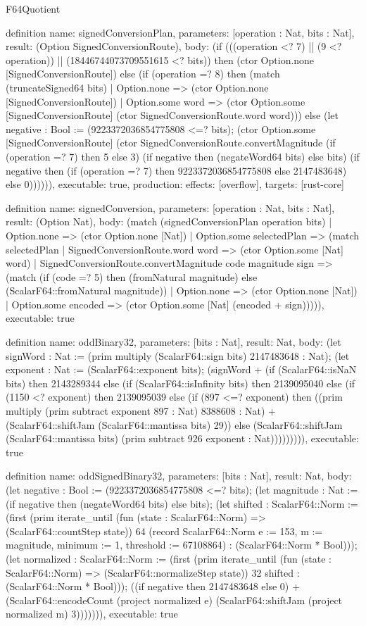 \begin{lexlean}{F64Quotient}
\begin{semanticmodule}
definition{
  name: signedConversionPlan,
  parameters: [operation : Nat, bits : Nat],
  result: (Option SignedConversionRoute),
  body: (if (((operation <? 7) || (9 <? operation)) || (18446744073709551615 <? bits)) then (ctor Option.none [SignedConversionRoute]) else (if (operation =? 8) then (match (truncateSigned64 bits)
    | Option.none => (ctor Option.none [SignedConversionRoute])
    | Option.some word => (ctor Option.some [SignedConversionRoute] (ctor SignedConversionRoute.word word))) else (let negative : Bool := (9223372036854775808 <=? bits); (ctor Option.some [SignedConversionRoute] (ctor SignedConversionRoute.convertMagnitude (if (operation =? 7) then 5 else 3) (if negative then (negateWord64 bits) else bits) (if negative then (if (operation =? 7) then 9223372036854775808 else 2147483648) else 0)))))),
  executable: true,
  production: {effects: [overflow], targets: [rust-core]}
}

definition{
  name: signedConversion,
  parameters: [operation : Nat, bits : Nat],
  result: (Option Nat),
  body: (match (signedConversionPlan operation bits)
    | Option.none => (ctor Option.none [Nat])
    | Option.some selectedPlan => (match selectedPlan
      | SignedConversionRoute.word word => (ctor Option.some [Nat] word)
      | SignedConversionRoute.convertMagnitude code magnitude sign => (match (if (code =? 5) then (fromNatural magnitude) else (ScalarF64::fromNatural magnitude))
        | Option.none => (ctor Option.none [Nat])
        | Option.some encoded => (ctor Option.some [Nat] (encoded + sign))))),
  executable: true
}

definition{
  name: oddBinary32,
  parameters: [bits : Nat],
  result: Nat,
  body: (let signWord : Nat := (prim multiply (ScalarF64::sign bits) 2147483648 : Nat); (let exponent : Nat := (ScalarF64::exponent bits); (signWord + (if (ScalarF64::isNaN bits) then 2143289344 else (if (ScalarF64::isInfinity bits) then 2139095040 else (if (1150 <? exponent) then 2139095039 else (if (897 <=? exponent) then ((prim multiply (prim subtract exponent 897 : Nat) 8388608 : Nat) + (ScalarF64::shiftJam (ScalarF64::mantissa bits) 29)) else (ScalarF64::shiftJam (ScalarF64::mantissa bits) (prim subtract 926 exponent : Nat))))))))),
  executable: true
}

definition{
  name: oddSignedBinary32,
  parameters: [bits : Nat],
  result: Nat,
  body: (let negative : Bool := (9223372036854775808 <=? bits); (let magnitude : Nat := (if negative then (negateWord64 bits) else bits); (let shifted : ScalarF64::Norm := (first (prim iterate_until (fun (state : ScalarF64::Norm) => (ScalarF64::countStep state)) 64 (record ScalarF64::Norm {e := 153, m := magnitude, minimum := 1, threshold := 67108864}) : (ScalarF64::Norm * Bool))); (let normalized : ScalarF64::Norm := (first (prim iterate_until (fun (state : ScalarF64::Norm) => (ScalarF64::normalizeStep state)) 32 shifted : (ScalarF64::Norm * Bool))); ((if negative then 2147483648 else 0) + (ScalarF64::encodeCount (project normalized e) (ScalarF64::shiftJam (project normalized m) 3))))))),
  executable: true
}


\end{semanticmodule}
\end{lexlean}
